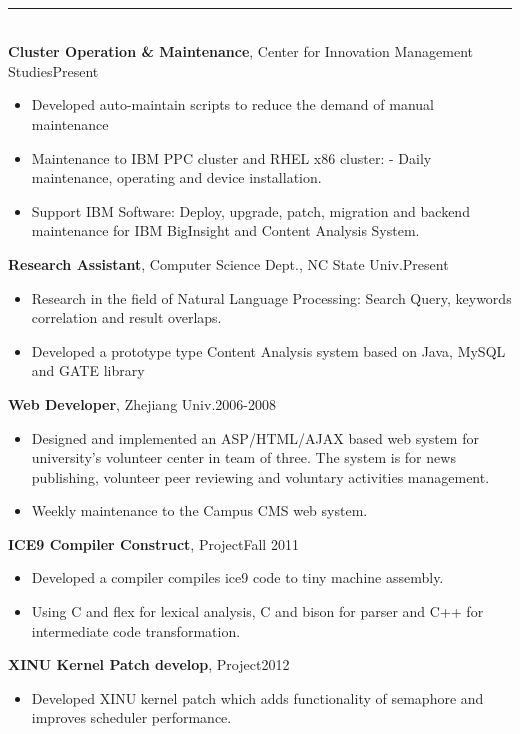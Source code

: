 \documentclass[10pt,oneside,a4paper,draft]{article} %
\newenvironment{CVsection}[1]{
    \hspace*{20pt}{\bf \Large #1}\\[-3pt]
    \rule[5pt]{\textwidth}{1pt}\\
}{
    \hspace{-10pt}\hfill\\[10pt]
}
\newenvironment{CVexperience}[3]{
    {\bf #1}, #2\hfill #3\\[2pt]
    \begin{itemize}
        \setlength{\parsep}{0pt}
        \setlength{\itemsep}{0pt}\vspace{-16pt}
}{
    \end{itemize}
}
\begin{document}
    \begin{CVsection}{\Large E\large XPERIENCE}
        \begin{CVexperience}{Cluster Operation \& Maintenance}{Center for Innovation Management Studies}{Present}
            \item Developed auto-maintain scripts to reduce the demand of manual maintenance
            \item Maintenance to IBM PPC cluster and RHEL x86 cluster: - Daily maintenance, operating and device installation.
            \item Support IBM Software: Deploy, upgrade, patch, migration and backend maintenance for IBM BigInsight and Content Analysis System.
        \end{CVexperience}
        \begin{CVexperience}{Research Assistant}{Computer Science Dept., NC State Univ.}{Present}
            \item Research in the field of Natural Language Processing: Search Query, keywords correlation and result overlaps.
            \item Developed a prototype type Content Analysis system based on Java, MySQL and GATE library
        \end{CVexperience}
        \begin{CVexperience}{Web Developer}{Zhejiang Univ.}{2006-2008}
            \item Designed and implemented an ASP/HTML/AJAX based web system for university’s volunteer center in team of three. The system is for news publishing, volunteer peer reviewing and voluntary activities management.
            \item Weekly maintenance to the Campus CMS web system.
        \end{CVexperience}
        \begin{CVexperience}{ICE9 Compiler Construct}{Project}{Fall 2011}
            \item Developed a compiler compiles ice9 code to tiny machine assembly.
            \item Using C and flex for lexical analysis, C and bison for parser and C++ for intermediate code transformation.
        \end{CVexperience}
        \begin{CVexperience}{XINU Kernel Patch develop}{Project}{2012}
            \item Developed XINU kernel patch which adds functionality of semaphore and improves scheduler performance.

\end{CVexperience}
\end{CVsection}
\end{document}
